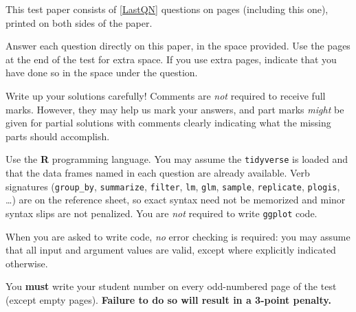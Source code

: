 \documentclass[11pt,twoside]{article}
\begin{document}
\noindent\parbox{5.25in}{%
    \qquad
    This test paper consists of
    \ref{LastQN} {questions} on
    \pageref{LastPage} {pages}
    (including this one), printed on both sides of the paper.

    \qquad
    Answer each question directly on this paper, in the space provided. Use the pages at the end of the test for extra space. If you use extra pages, indicate that you have done so in the space under the question.

    \qquad
    Write up your solutions carefully! Comments are \emph{not} required to
    receive full marks. However, they may help us mark your answers, and
    part marks \emph{might} be given for partial solutions with comments
    clearly indicating what the missing parts should accomplish.

    \qquad
    Use the \textbf{R} programming language. You may assume the
    \texttt{tidyverse} is loaded and that the data frames named in each
    question are already available. Verb signatures
    (\texttt{group\_by}, \texttt{summarize}, \texttt{filter},
    \texttt{lm}, \texttt{glm}, \texttt{sample}, \texttt{replicate},
    \texttt{plogis}, \dots) are on the reference sheet, so exact syntax need
    not be memorized and minor syntax slips are not penalized. You are
    \emph{not} required to write \texttt{ggplot} code.

    \qquad
    When you are asked to write code,
    \emph{no} error checking is required:
    you may assume that all input and argument values are valid,
    except where explicitly indicated otherwise.

    \qquad
    You \textbf{must} write your student number on every odd-numbered page of the test (except empty pages). \textbf{Failure to do so will result in a 3-point penalty.}
}%
\hfillstretch
{}
\hfillstretch[.25]

\vfillstretch
\newpage
\fi%
\fi%




\ifanswerspace\newpage\fi


\ifanswerspace\newpage\fi


\ifanswerspace\newpage\fi


\ifanswerspace\newpage\fi


\ifanswerspace\newpage\fi


\ifanswerspace\newpage\fi


\ifanswerspace\newpage\fi


\ifanswerspace\newpage\fi


\newpage
\vfillstretch
\newpage
\vfillstretch


\ifanswerspace\ifsolutions\else\newpage\blankpage\blankpage\fi\fi

\ifanswerspace\ifsolutions\else
{}
\fi\fi
{}
\end{document}
